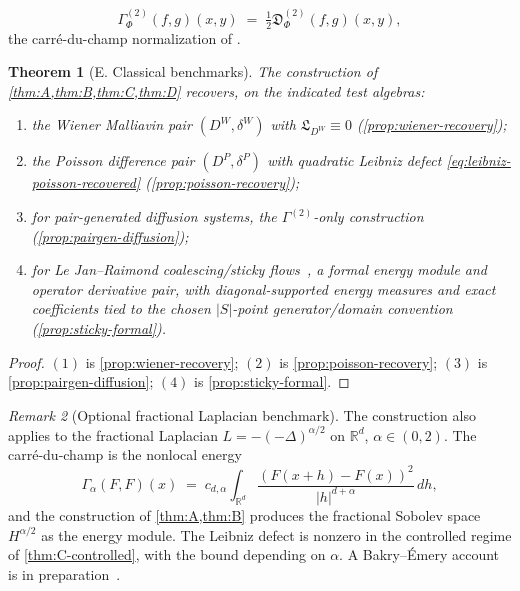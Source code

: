 \documentclass[11pt,reqno]{amsart}
\theoremstyle{plain}
\newtheorem{theorem}{Theorem}[section]
\theoremstyle{definition}
\theoremstyle{remark}
\newtheorem{remark}[theorem]{Remark}
\newcommand{\R}{\mathbb{R}}
\newcommand{\Lleib}{\mathfrak L}
\begin{document}
\begin{equation}\label{eq:gamma-twopoint-recall}
  \Gamma^{(2)}_{\Phi}(f,g)(x,y)
  \;=\;\tfrac{1}{2}\mathfrak D^{(2)}_{\Phi}(f,g)(x,y),
\end{equation}
the carr\'e-du-champ normalization of \cite[\S 5]{PrimitiveDivergence}.

\begin{theorem}[E. Classical benchmarks]\label{thm:E}
The construction of \cref{thm:A,thm:B,thm:C,thm:D} recovers, on
the indicated test algebras:
\begin{enumerate}
\item[$(\mathrm 1)$] the Wiener Malliavin pair $(D^{W},\delta^{W})$
with $\Lleib_{D^{W}}\equiv 0$ (\cref{prop:wiener-recovery});
\item[$(\mathrm 2)$] the Poisson difference pair $(D^{P},\delta^{P})$
with quadratic Leibniz defect
\eqref{eq:leibniz-poisson-recovered} (\cref{prop:poisson-recovery});
\item[$(\mathrm 3)$] for pair-generated diffusion systems, the
$\Gamma^{(2)}$-only construction
(\cref{prop:pairgen-diffusion});
\item[$(\mathrm 4)$] for Le Jan--Raimond coalescing/sticky
flows~\cite{LeJanRaimond2004}, a formal energy module and
operator derivative pair, with diagonal-supported energy
measures and exact coefficients tied to the chosen
$|S|$-point generator/domain convention
(\cref{prop:sticky-formal}).
\end{enumerate}
\end{theorem}

\begin{proof}
$(\mathrm 1)$ is \cref{prop:wiener-recovery}; $(\mathrm 2)$ is
\cref{prop:poisson-recovery}; $(\mathrm 3)$ is
\cref{prop:pairgen-diffusion}; $(\mathrm 4)$ is
\cref{prop:sticky-formal}.
\end{proof}

\begin{remark}[Optional fractional Laplacian benchmark]\label{rem:fractional}
The construction also applies to the fractional Laplacian
$L=-(-\Delta)^{\alpha/2}$ on $\R^{d}$, $\alpha\in(0,2)$. The
carr\'e-du-champ \cite[Eq.~(5.7)]{PrimitiveDivergence} is the
nonlocal energy
\[
  \Gamma_{\alpha}(F,F)(x)
  \;=\;c_{d,\alpha}\int_{\R^{d}}\frac{(F(x+h)-F(x))^{2}}{|h|^{d+\alpha}}\,dh,
\]
and the construction of \cref{thm:A,thm:B} produces the
fractional Sobolev space $H^{\alpha/2}$ as the energy module.
The Leibniz defect is nonzero in the controlled regime of
\cref{thm:C-controlled}, with the bound depending on
$\alpha$. A Bakry--\'Emery account is in
preparation~\cite{FontesFracBE}.
\end{remark}
\end{document}
